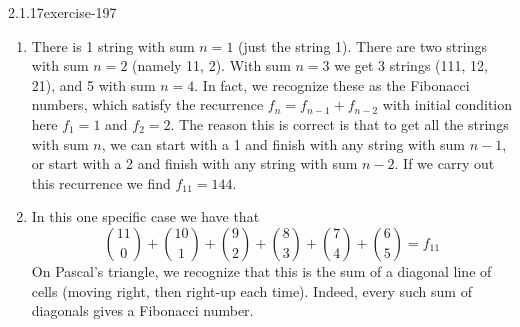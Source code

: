\documentclass[twoside,11pt,]{book}
\numberwithin{equation}{chapter}
\begin{document}
\begin{divisionsolution}{2.1.17}{}{exercise-197}
\begin{enumerate}[label=(\alph*)]
\begin{equation*}
1 + 10 + 36 + 56 + 35 + 6 = 144 \text{ strings}
\end{equation*}
%
\item\hypertarget{li-1807}{}\hypertarget{p-3058}{}%
There is 1 string with sum \(n = 1\) (just the string 1). There are two strings with sum \(n = 2\) (namely 11, 2). With sum \(n = 3\) we get 3 strings (111, 12, 21), and 5 with sum \(n = 4\). In fact, we recognize these as the Fibonacci numbers, which satisfy the recurrence \(f_n = f_{n-1} + f_{n-2}\) with initial condition here \(f_1 = 1\) and \(f_2 = 2\). The reason this is correct is that to get all the strings with sum \(n\), we can start with a 1 and finish with any string with sum \(n-1\), or start with a 2 and finish with any string with sum \(n - 2\). If we carry out this recurrence we find \(f_{11} = 144\).%
\item\hypertarget{li-1808}{}\hypertarget{p-3059}{}%
In this one specific case we have that%
\begin{equation*}
{11\choose 0} + {10 \choose 1} + {9 \choose 2} + {8 \choose 3} + {7 \choose 4} + {6 \choose 5} = f_{11}
\end{equation*}
On Pascal's triangle, we recognize that this is the sum of a diagonal line of cells (moving right, then right-up each time). Indeed, every such sum of diagonals gives a Fibonacci number.%
\end{enumerate}
%
\end{divisionsolution}%
\end{document}
